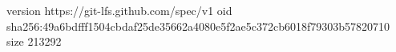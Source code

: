 version https://git-lfs.github.com/spec/v1
oid sha256:49a6bdfff1504cbdaf25de35662a4080e5f2ae5c372cb6018f79303b57820710
size 213292
